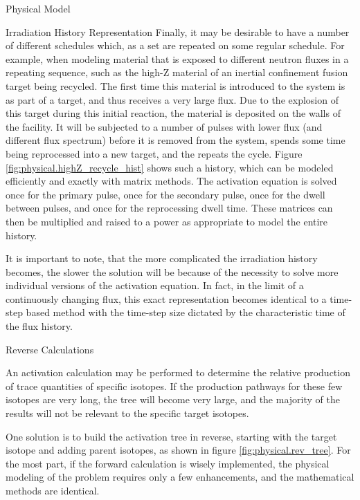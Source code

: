 \begin{chapter}{Physical Model\label{chap:physical}}
\begin{section}{Irradiation History Representation}
  Finally, it may be desirable to have a number of different schedules
  which, as a set are repeated on some regular schedule.  For example,
  when modeling material that is exposed to different neutron fluxes
  in a repeating sequence, such as the high-Z material of an inertial
  confinement fusion target being
  recycled\cite{UCBerkeley.NIF.Target}.  The first time this material
  is introduced to the system is as part of a target, and thus
  receives a very large flux.  Due to the explosion of this target
  during this initial reaction, the material is deposited on the walls
  of the facility.  It will be subjected to a number of pulses with
  lower flux (and different flux spectrum) before it is removed from
  the system, spends some time being reprocessed into a new target,
  and the repeats the cycle.  Figure
  \ref{fig:physical.highZ_recycle_hist} shows such a history, which
  can be modeled efficiently and exactly with matrix methods.  The
  activation equation is solved once for the primary pulse, once for
  the secondary pulse, once for the dwell between pulses, and once for
  the reprocessing dwell time.  These matrices can then be multiplied
  and raised to a power as appropriate to model the entire history.

  It is important to note, that the more complicated the irradiation
  history becomes, the slower the solution will be because of the
  necessity to solve more individual versions of the activation
  equation.  In fact, in the limit of a continuously changing flux,
  this exact representation becomes identical to a time-step based
  method with the time-step size dictated by the characteristic time
  of the flux history.
\end{section}


\begin{section}{Reverse Calculations}
  
  An activation calculation may be performed to determine the relative
  production of trace quantities of specific isotopes.  If the
  production pathways for these few isotopes are very long, the tree
  will become very large, and the majority of the results will not be
  relevant to the specific target isotopes.
  
  One solution is to build the activation tree in reverse, starting
  with the target isotope and adding parent isotopes, as shown in
  figure \ref{fig:physical.rev_tree}.  For the most part, if the
  forward calculation is wisely implemented, the physical modeling of
  the problem requires only a few enhancements, and the mathematical
  methods are identical.
  

\end{section}
\end{chapter}
